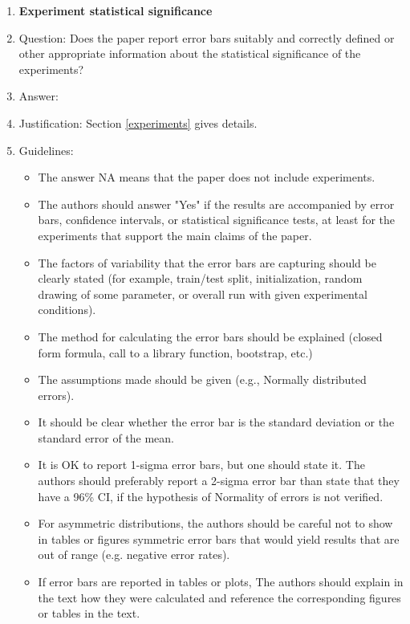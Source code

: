 \documentclass{article}
\begin{document}
\begin{enumerate}
\item {\bf Experiment statistical significance}
    \item[] Question: Does the paper report error bars suitably and correctly defined or other appropriate information about the statistical significance of the experiments?
    \item[] Answer: \answerYes{} %
    \item[] Justification: Section \ref{experiments} gives details.
    \item[] Guidelines:
    \begin{itemize}
        \item The answer NA means that the paper does not include experiments.
        \item The authors should answer "Yes" if the results are accompanied by error bars, confidence intervals, or statistical significance tests, at least for the experiments that support the main claims of the paper.
        \item The factors of variability that the error bars are capturing should be clearly stated (for example, train/test split, initialization, random drawing of some parameter, or overall run with given experimental conditions).
        \item The method for calculating the error bars should be explained (closed form formula, call to a library function, bootstrap, etc.)
        \item The assumptions made should be given (e.g., Normally distributed errors).
        \item It should be clear whether the error bar is the standard deviation or the standard error of the mean.
        \item It is OK to report 1-sigma error bars, but one should state it. The authors should preferably report a 2-sigma error bar than state that they have a 96\% CI, if the hypothesis of Normality of errors is not verified.
        \item For asymmetric distributions, the authors should be careful not to show in tables or figures symmetric error bars that would yield results that are out of range (e.g. negative error rates).
        \item If error bars are reported in tables or plots, The authors should explain in the text how they were calculated and reference the corresponding figures or tables in the text.
    \end{itemize}


\end{enumerate}
\end{document}
